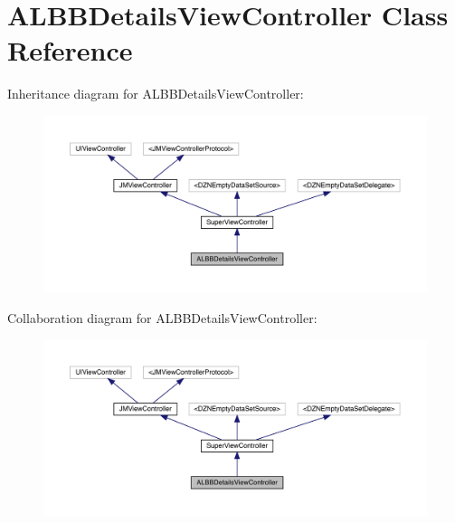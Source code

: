 \hypertarget{interface_a_l_b_b_details_view_controller}{}\section{A\+L\+B\+B\+Details\+View\+Controller Class Reference}
\label{interface_a_l_b_b_details_view_controller}


Inheritance diagram for A\+L\+B\+B\+Details\+View\+Controller\+:\nopagebreak
\begin{figure}[H]
\begin{center}
\leavevmode
\includegraphics[width=350pt]{interface_a_l_b_b_details_view_controller__inherit__graph}
\end{center}
\end{figure}


Collaboration diagram for A\+L\+B\+B\+Details\+View\+Controller\+:\nopagebreak
\begin{figure}[H]
\begin{center}
\leavevmode
\includegraphics[width=350pt]{interface_a_l_b_b_details_view_controller__coll__graph}
\end{center}
\end{figure}
